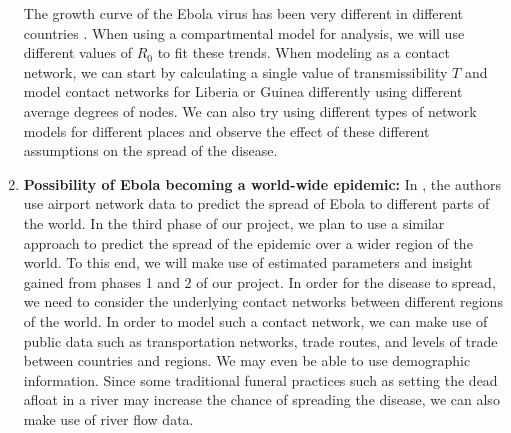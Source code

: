 \documentclass[10pt, journal,onecolumn]{IEEEtran}
\begin{document}
\begin{enumerate}
  The growth curve of the Ebola virus has been very different in different countries \citep{cmriversdata}.
  When using a compartmental model for analysis, we will use different values of $R_0$ to fit these
  trends.
  When modeling as a contact network, we can start by calculating a single value of transmissibility
  $T$ and model contact networks for Liberia or Guinea differently using different average degrees of
  nodes.
  We can also try using different types of network models for different places
  and observe the effect of these different assumptions on the spread of the disease.

\item \textbf{Possibility of Ebola becoming a world-wide epidemic:} In \citep{gomes2014assessing},
  the authors use airport network data to predict the spread of Ebola to different parts of the
  world. In the third phase of our project, we plan to use a similar approach to predict the
  spread of the epidemic over a wider region of the world. To this end, we will make use of
  estimated parameters and insight gained from phases 1 and 2 of our project.
  In order for the disease to
  spread, we need to consider the underlying contact networks between different regions of the
  world. In order to model such a contact network, we can make use of public data such
  as transportation networks, trade routes, and levels of trade between countries and regions.
  We may even be able to use demographic information.
  Since some traditional funeral practices such as setting the dead afloat in a river
  may increase the chance of spreading the disease, we can also make use of river flow data.

\end{enumerate}



%






\end{document}
